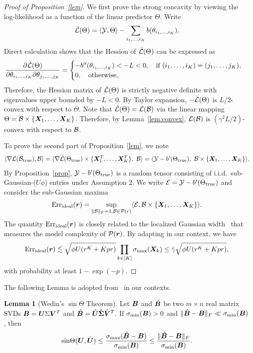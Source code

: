 \documentclass[12pt]{article}
\theoremstyle{definition}
\newtheorem{lem}{Lemma}[section]
\begin{document}
\begin{proof}[Proof of Proposition~\ref{lem}] We first prove the strong concavity by viewing the log-likelihood as a function of the linear predictor $\Theta$. Write
\[
\bar {\mathcal{L}}(\Theta)=\langle \mathcal{Y}, \Theta \rangle -\sum_{i_1,\ldots,i_K}b(\theta_{i_1,\ldots,i_K}).
\]
Direct calculation shows that the Hession of $\bar {\mathcal{L}}(\Theta)$ can be expressed as
\[
{\partial \bar {\mathcal{L}}(\Theta) \over \partial \theta_{i_1,\ldots,i_K}\partial \theta_{j_1,\ldots,j_K}}=
\begin{cases}
 -b''(\theta_{i_1,\ldots,i_K})<-L<0,\quad \text{if } (i_1,\ldots,i_K)= (j_1,\ldots,j_K),\\
 0, \quad \text{otherwise},
 \end{cases}
\]
Therefore, the Hession matrix of $\bar {\mathcal{L}}(\Theta)$ is strictly negative definite with eigenvalues upper bounded by $-L<0$. By Taylor expansion, $-\bar {\mathcal{L}}(\Theta)$ is $L/2$-convex with respect to $\Theta$. Note that $\bar {\mathcal{L}}(\Theta)=\mathcal{L}(\mathcal{B})$ via the linear mapping $\Theta=\mathcal{B}\times\{\bm X_1,\ldots,\bm X_K\}$. Therefore, by Lemma~\ref{lem:convex}, $\mathcal{L}(\mathcal{B})$ is $(\gamma^2L/2)$-convex with respect to $\mathcal{B}$. 

To prove the second part of Proposition~\ref{lem}, we note
\[
\langle \nabla \tL(\trueB), \tB\rangle=\langle \nabla \bar\tL(\trueT)\times\{\mX^T_1,\ldots,\mX^T_K\},\ \tB \rangle =\langle \tY-b'(\trueT),\ \tB\times\{\mX_1,\dots,\mX_K\}\rangle.
 \]
By Proposition~\ref{prop}, $\mathcal{Y}-b'(\Theta_{\textup{true}})$ is a random tensor consisting of i.i.d.\ sub-Gaussian-($U\phi$) entries under Assumption 2. We write $\mathcal{E}=\mathcal{Y}-b'(\Theta_{\textup{true}})$ and consider the sub-Gaussian maxima
\[
\text{Err}_{\textup{ideal}}(\bm{r})=\sup_{\lVert\mathcal{B}\rVert_F=1, \mathcal{B}\in\mathcal{P}(r)}\langle \mathcal{E}, \mathcal{B}\times\{\bm X_1,\ldots,\bm X_K\}\rangle.
\]
The quantity $\text{Err}_{\textup{ideal}}(\bm{r})$ is closely related to the localized Gaussian width~\citep{chen2019non,han2020optimal} that measures the model complexity of $\mathcal{P}(\bm{r})$. By adapting \citet[Lemma E.5]{han2020optimal} in our context, we have
\[
\text{Err}_{\textup{ideal}}(\bm{r}) \lesssim  \sqrt{\phi U(r^K+Kpr)}\prod_{k\in[K]} \sigma_{\max}({\bm X_k}) \leq \bar \gamma  \sqrt{\phi U(r^K+Kpr)},
\]
with probability at least $1-\exp(-p)$. 
\end{proof}

The following Lemma is adopted from~\citet[Theorem 6.1]{wang2017tensor} in our contexts. 
\begin{lem}[Wedin's $\sin\Theta$ Theorem]\label{prop:sinebound}
Let $\bm B$ and $\hat{\bm B}$ be two $m\times n$ real matrix SVDs $\bm B = \bm{U}\Sigma\bm{V}^T$ and $\hat{\bm B} = \hat{\bm{U}}\hat{\bm \Sigma}\hat{\bm{V}}^T.$ If $\sigma_{\text{min}}(\bm B)>0$ and $\lVert\hat{\bm B}-\bm B\rVert_F\ll \sigma_{\text{min}}(\bm B)$, then
\begin{align}\label{eq:sine}
    \text{sin} \Theta(\bm{U},\hat{\bm{U}}) \leq \frac{\sigma_{\max}(\hat{\bm B}-\bm B)}{\sigma_{\text{min}}(\bm B)}\leq \frac{\lVert\hat{\bm B}-\bm B\rVert_F}{\sigma_{\text{min}}(\bm B)}.
\end{align}
\end{lem}
\end{document}
